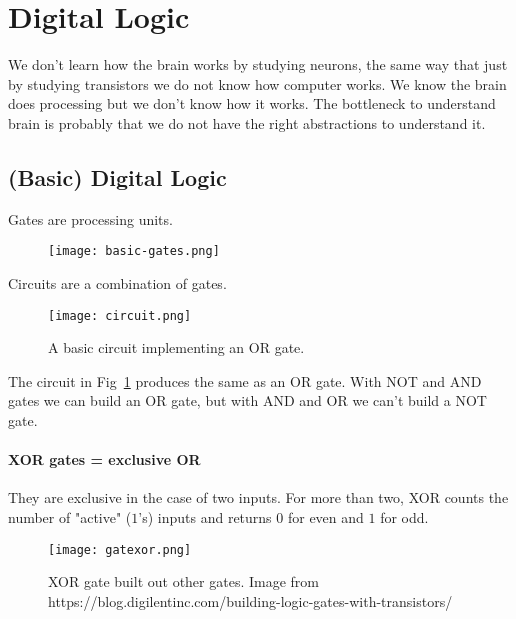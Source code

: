 \documentclass[main]{subfiles}
\begin{document}

\section{Digital Logic}

We don't learn how the brain works by studying neurons, the same way that just by studying transistors we do not know how computer works.
We know the brain does processing but we don't know how it works. The bottleneck to understand brain is probably that we do not have the right abstractions to understand it.

\subsection{(Basic) Digital Logic}

Gates are processing units.

\begin{figure}[H]
	\centering
	\texttt{[image: basic-gates.png]}
\end{figure}

Circuits are a combination of gates.

\begin{figure}[H]
	\centering
	\texttt{[image: circuit.png]}
	\label{fig:circuit}
	\caption{A basic circuit implementing an OR gate.}
\end{figure}

The circuit in Fig~\ref{fig:circuit} produces the same as an OR gate. With NOT and AND gates we can build an OR gate, but with AND and OR we can't build a NOT gate.

\paragraph{XOR gates = exclusive OR}
They are exclusive in the case of two inputs. For more than two, XOR counts the number of "active" ($1$'s) inputs and returns $0$ for even and $1$ for odd.

\begin{figure}[H]
	\centering
	\texttt{[image: gatexor.png]}
	\caption{XOR gate built out other gates. Image from https://blog.digilentinc.com/building-logic-gates-with-transistors/}
\end{figure}
\end{document}
